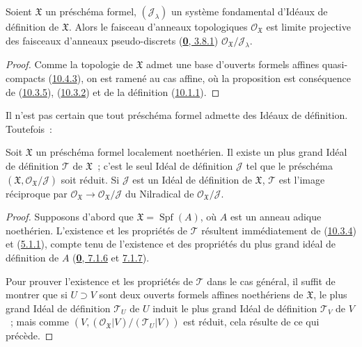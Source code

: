 \begin{proposition}[10.5.3]
\label{I.10.5.3-fr}
Soient $\mathfrak{X}$ un préschéma formel, $(\mathscr{J}_\lambda)$ un
système fondamental d'Idéaux de définition de $\mathfrak{X}$. Alors le
faisceau d'anneaux topologiques $\mathscr{O}_{\mathfrak{X}}$ est limite
projective des faisceaux d'anneaux pseudo-discrets
\textup{(\hyperref[0.3.8.1-fr]{\textbf{0}, 3.8.1})}
$\mathscr{O}_{\mathfrak{X}}/\mathscr{J}_\lambda$.
\end{proposition}

\begin{proof}
Comme la topologie de $\mathfrak{X}$ admet une base d'ouverts formels
affines quasi-compacts (\hyperref[I.10.4.3-fr]{10.4.3}), on est ramené au
cas affine, où la proposition est conséquence de
(\hyperref[I.10.3.5-fr]{10.3.5}),
(\hyperref[I.10.3.2-fr]{10.3.2}) et de la définition
(\hyperref[I.10.1.1-fr]{10.1.1}).
\end{proof}

Il n'est pas certain que tout préschéma formel admette des Idéaux de
définition. Toutefois~:

\begin{proposition}[10.5.4]
\label{I.10.5.4-fr}
Soit $\mathfrak{X}$ un préschéma formel localement noethérien. Il existe
un plus grand Idéal de définition $\mathscr{T}$ de $\mathfrak{X}$~;
c'est le seul Idéal de définition $\mathscr{J}$ tel que le préschéma
$(\mathfrak{X},\mathscr{O}_{\mathfrak{X}}/\mathscr{J})$ soit réduit. Si
$\mathscr{J}$ est un Idéal de définition de $\mathfrak{X}$,
$\mathscr{T}$ est l'image réciproque par
$\mathscr{O}_{\mathfrak{X}}\to
\mathscr{O}_{\mathfrak{X}}/\mathscr{J}$ du Nilradical de
$\mathscr{O}_{\mathfrak{X}}/\mathscr{J}$.
\end{proposition}

\begin{proof}
Supposons d'abord que $\mathfrak{X}=\operatorname{Spf}(A)$, où $A$ est
un anneau adique noethérien. L'existence et les propriétés de
$\mathscr{T}$ résultent immédiatement de
(\hyperref[I.10.3.4-fr]{10.3.4}) et
(\hyperref[I.5.1.1-fr]{5.1.1}), compte tenu de l'existence et des
propriétés du plus grand idéal de définition de $A$
(\hyperref[0.7.1.6-fr]{\textbf{0}, 7.1.6} et
\hyperref[0.7.1.7-fr]{7.1.7}).

Pour prouver l'existence et les propriétés de $\mathscr{T}$ dans le cas
général, il suffit de montrer que si $U\supset V$ sont deux ouverts
formels affines noethériens de $\mathfrak{X}$, le plus grand Idéal de
définition $\mathscr{T}_U$ de $U$ induit le plus grand Idéal de définition
$\mathscr{T}_V$ de $V$~; mais comme
$(V,(\mathscr{O}_{\mathfrak{X}}|V)/(\mathscr{T}_U|V))$ est réduit, cela
résulte de ce qui précède.
\end{proof}

